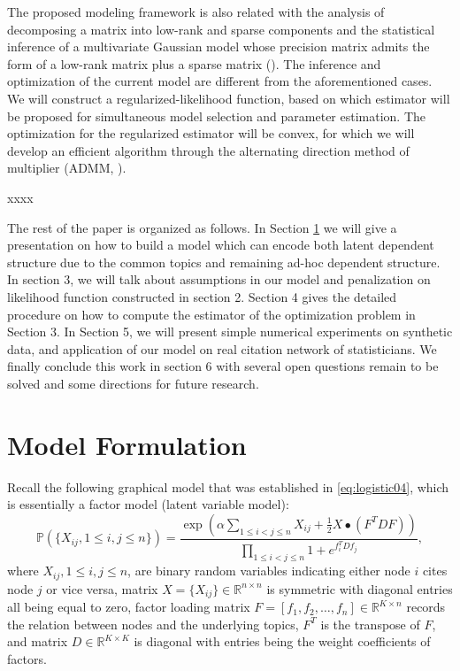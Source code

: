 \documentclass[AMS,STIX1COL]{WileyNJD-v2}
\begin{document}
The proposed modeling framework is also related with the analysis of decomposing a matrix into low-rank and sparse components and the statistical inference of a multivariate Gaussian model whose precision matrix admits the form of a low-rank matrix plus a sparse matrix (\cite{chandrasekaran2010latent, candes2011robust, zhou2010stable}).
The inference and optimization of the current model are different from the aforementioned cases.
We will construct a regularized-likelihood function, based on which estimator will be proposed for simultaneous model selection and parameter estimation.
The optimization for the regularized estimator will be convex, for which we will develop an efficient algorithm through the alternating direction method of multiplier (ADMM, \cite{boyd2011distributed, gabay1975dual, glowinski1975solution}).

xxxx 

The rest of the paper is organized as follows.
In Section \ref{sec:model-form} we will give a presentation on how to build a model which can encode both latent dependent structure due to the common topics and remaining ad-hoc dependent structure.
In section 3, we will talk about assumptions in our model and penalization on likelihood function constructed in section 2.
Section 4 gives the detailed procedure on how to compute the estimator of the optimization problem in Section 3.
In Section 5, we will present simple numerical experiments on synthetic data, and application of our model on real citation network of statisticians.
We finally conclude this work in section 6 with several open questions remain to be solved and some directions for future research.

\section{Model Formulation}
\label{sec:model-form}

Recall the following graphical model that was established in \eqref{eq:logistic04}, which is essentially a factor model (latent variable model):
$$
\mathbb{P}(\{X_{ij}, 1\le i,j \le n\})
= \frac{\exp(\alpha \sum_{1\le i< j\le n}X_{ij} +\frac{1}{2} X \bullet (F^T D F))}{\prod_{1\le i<j \le n}  1 + e^{f_i^T D f_j }},
$$
where
$X_{ij}, 1\le i,j \le n$, are binary random variables indicating either node $i$ cites node $j$ or vice versa,
matrix $X = \{X_{ij}\} \in \mathbb{R}^{n \times n}$ is symmetric with diagonal entries all being equal to zero,
factor loading matrix $F = [f_1,f_2,\ldots,f_n]\in \mathbb{R}^{K\times n}$ records the relation between nodes and the underlying topics, $F^T$ is the transpose of $F$,
and matrix $D \in \mathbb{R}^{K \times K}$  is diagonal with entries being the weight coefficients of factors.
\end{document}
